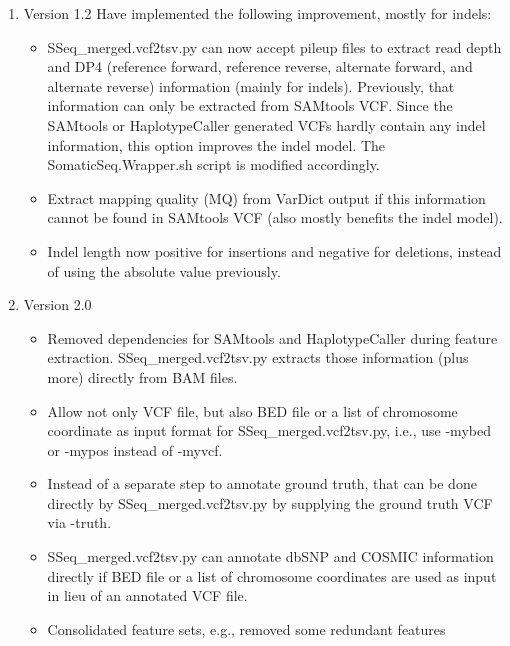 \documentclass[10pt,letterpaper]{article}
\begin{document}
\begin{sloppypar}
\begin{enumerate}
    \item Version 1.2
    Have implemented the following improvement, mostly for indels:

    \begin{itemize}

      \item 
      SSeq\_merged.vcf2tsv.py can now accept pileup files to extract read depth and DP4 (reference forward, reference reverse, alternate forward, and alternate reverse) information (mainly for indels). Previously, that information can only be extracted from SAMtools VCF. Since the SAMtools or HaplotypeCaller generated VCFs hardly contain any indel information, this option improves the indel model. The SomaticSeq.Wrapper.sh script is modified accordingly.
	    \item
	    Extract mapping quality (MQ) from VarDict output if this information cannot be found in SAMtools VCF (also mostly benefits the indel model). 
	   
	    \item
	    Indel length now positive for insertions and negative for deletions, instead of using the absolute value previously. 
	 
	\end{itemize}
	
	
	
	\item Version 2.0
	
		\begin{itemize}
		  \item
		  Removed dependencies for SAMtools and HaplotypeCaller during feature extraction. SSeq\_merged.vcf2tsv.py extracts those information (plus more) directly from BAM files.
		
		  \item
		  Allow not only VCF file, but also BED file or a list of chromosome coordinate as input format for SSeq\_merged.vcf2tsv.py, i.e., use -mybed or -mypos instead of -myvcf. 
		
		  \item
		  Instead of a separate step to annotate ground truth, that can be done directly by SSeq\_merged.vcf2tsv.py by supplying the ground truth VCF via -truth.
		
		  \item
		  SSeq\_merged.vcf2tsv.py can annotate dbSNP and COSMIC information directly if BED file or a list of chromosome coordinates are used as input in lieu of an annotated VCF file. 
		
		  \item
		  Consolidated feature sets, e.g., removed some redundant features
		  

\end{itemize}
\end{enumerate}
\end{sloppypar}
\end{document}
